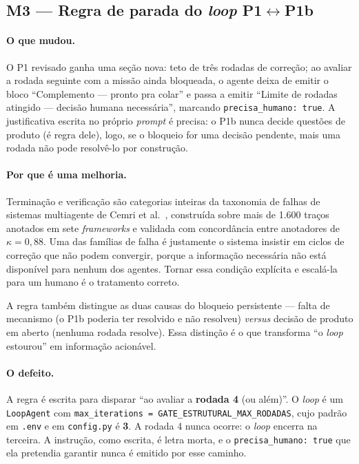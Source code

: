 \documentclass[11pt,a4paper]{article}
\newcommand{\cod}[1]{\texttt{\small #1}}
\begin{document}
\subsection{M3 --- Regra de parada do \textit{loop} P1$\leftrightarrow$P1b}
\label{sec:m3}

\paragraph{O que mudou.} O P1 revisado ganha uma seção nova: teto de três rodadas de correção; ao avaliar a
rodada seguinte com a missão ainda bloqueada, o agente deixa de emitir o bloco ``Complemento --- pronto pra
colar'' e passa a emitir ``Limite de rodadas atingido --- decisão humana necessária'', marcando
\cod{precisa\_humano: true}. A justificativa escrita no próprio \textit{prompt} é precisa: o P1b nunca decide
questões de produto (é regra dele), logo, se o bloqueio for uma decisão pendente, mais uma rodada não pode
resolvê-lo por construção.

\paragraph{Por que é uma melhoria.} Terminação e verificação são categorias inteiras da taxonomia de falhas
de sistemas multiagente de Cemri et al.~\cite{cemri2025}, construída sobre mais de 1.600 traços anotados em
sete \textit{frameworks} e validada com concordância entre anotadores de $\kappa = 0{,}88$. Uma das famílias
de falha é justamente o sistema insistir em ciclos de correção que não podem convergir, porque a informação
necessária não está disponível para nenhum dos agentes. Tornar essa condição explícita e escalá-la para um
humano é o tratamento correto.

A regra também distingue as duas causas do bloqueio persistente --- falta de mecanismo (o P1b poderia ter
resolvido e não resolveu) \textit{versus} decisão de produto em aberto (nenhuma rodada resolve). Essa
distinção é o que transforma ``o \textit{loop} estourou'' em informação acionável.

\paragraph{O defeito.} A regra é escrita para disparar ``ao avaliar a \textbf{rodada 4} (ou além)''. O
\textit{loop} é um \cod{LoopAgent} com \cod{max\_iterations = GATE\_ESTRUTURAL\_MAX\_RODADAS}, cujo padrão em
\texttt{.env} e em \texttt{config.py} é \textbf{3}. A rodada 4 nunca ocorre: o \textit{loop} encerra na
terceira. A instrução, como escrita, é letra morta, e o \cod{precisa\_humano: true} que ela pretendia
garantir nunca é emitido por esse caminho.
\end{document}
